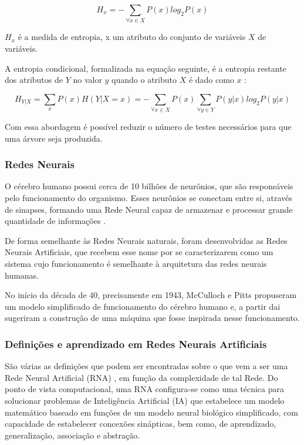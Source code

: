 \begin{equation}
H_{x}=-\sum_{\forall x \in X}P(x)log_{2}P(x)
\end{equation}

$ H_{x} $ é a medida de entropia, x um atributo do conjunto de variáveis $X$ de variáveis. 

A entropia condicional, formalizada na equação seguinte, é a entropia restante dos atributos de $Y$ no valor $y$ quando o atributo $X$ é dado como $x$ \cite{DecisionTree}:

\begin{equation}
H_{Y|X}= \sum_{x}P(x)H(Y|X=x) =-\sum_{\forall x \in X}P(x) \sum_{\forall y \in Y}P(y|x)log_{2}P(y|x)
\end{equation}

Com essa abordagem é possível reduzir o número de testes necessários para que uma árvore seja produzida.


\subsubsection{Redes Neurais}

\vspace{5mm}

O cérebro humano possui cerca de 10 bilhões de neurônios, que são responsáveis pelo funcionamento do organismo. 
Esses neurônios se conectam entre si, através de sinapses, formando uma Rede Neural capaz de armazenar e processar grande quantidade de informações \cite{NorvigRussel2004}.

De forma semelhante às Redes Neurais naturais, foram desenvolvidas as Redes Neurais Artificiais, que recebem esse nome por se caracterizarem como um sistema cujo funcionamento é semelhante à arquitetura das redes neurais humanas.
 
No início da década de 40, precisamente em 1943, McCulloch e Pitts \cite{Heaton2008} propuseram um modelo simplificado de funcionamento do cérebro humano e, 
a partir dai sugeriram a construção de uma máquina que fosse inspirada nesse funcionamento.


\subsubsection{Definições e aprendizado em Redes Neurais Artificiais}

São várias as definições que podem ser encontradas sobre o que vem a ser uma Rede Neural Artificial (RNA) \cite{Castanheira2008}, em função da complexidade de tal Rede. 
Do ponto de vista computacional, uma RNA configura-se como uma técnica para solucionar problemas de Inteligência Artificial (IA) que estabelece um modelo matemático 
baseado em funções de um modelo neural biológico simplificado, com capacidade de estabelecer concexões sinápticas, bem como, de aprendizado, generalização, associação e abstração.

